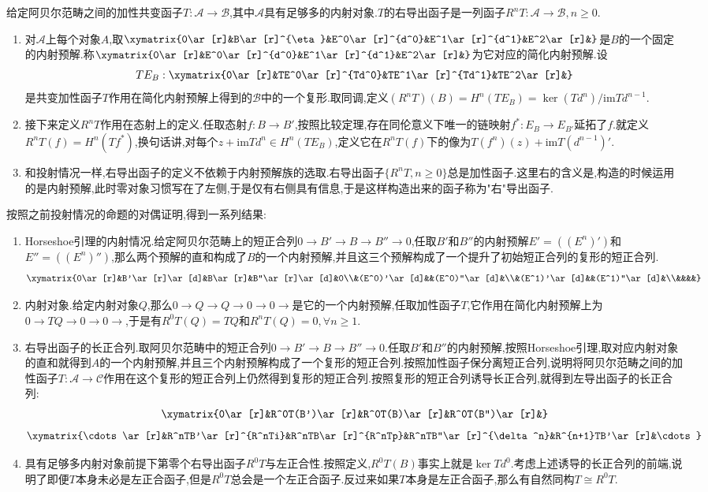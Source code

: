 给定阿贝尔范畴之间的加性共变函子$T:\mathscr{A}\to\mathscr{B}$,其中$\mathscr{A}$具有足够多的内射对象.$T$的右导出函子是一列函子$R^nT:\mathscr{A}\to\mathscr{B},n\ge0$.
\begin{enumerate}
	\item 对$\mathscr{A}$上每个对象$A$,取$\xymatrix{0\ar[r]&B\ar[r]^{\eta}&E^0\ar[r]^{d^0}&E^1\ar[r]^{d^1}&E^2\ar[r]&}$是$B$的一个固定的内射预解.称$\xymatrix{0\ar[r]&E^0\ar[r]^{d^0}&E^1\ar[r]^{d^1}&E^2\ar[r]&}$为它对应的简化内射预解.设$$TE_B:\xymatrix{0\ar[r]&TE^0\ar[r]^{Td^0}&TE^1\ar[r]^{Td^1}&TE^2\ar[r]&}$$是共变加性函子$T$作用在简化内射预解上得到的$\mathscr{B}$中的一个复形.取同调,定义$(R^nT)(B)=H^n(TE_B)=\ker(Td^n)/\mathrm{im}Td^{n-1}$.
	\item 接下来定义$R^nT$作用在态射上的定义.任取态射$f:B\to B'$,按照比较定理,存在同伦意义下唯一的链映射$f^*:E_B\to E_{B'}$延拓了$f$.就定义$R^nT(f)=H^n(Tf^*)$,换句话讲,对每个$z+\mathrm{im}Td^{n}\in H^n(TE_B)$,定义它在$R^nT(f)$下的像为$T(f^n)(z)+\mathrm{im}T(d^{n-1})'$.
	\item 和投射情况一样,右导出函子的定义不依赖于内射预解族的选取.右导出函子$\{R^nT,n\ge0\}$总是加性函子.这里右的含义是,构造的时候运用的是内射预解,此时零对象习惯写在了左侧,于是仅有右侧具有信息,于是这样构造出来的函子称为"右"导出函子.
\end{enumerate}

按照之前投射情况的命题的对偶证明,得到一系列结果:
\begin{enumerate}
	\item Horseshoe引理的内射情况.给定阿贝尔范畴上的短正合列$0\to B'\to B\to B''\to0$,任取$B'$和$B''$的内射预解$E'=((E^n)')$和$E''=((E^n)'')$,那么两个预解的直和构成了$B$的一个内射预解,并且这三个预解构成了一个提升了初始短正合列的复形的短正合列.
	$$\xymatrix{0\ar[r]&B'\ar[r]\ar[d]&B\ar[r]&B''\ar[r]\ar[d]&0\\&(E^0)'\ar[d]&&(E^0)''\ar[d]&\\&(E^1)'\ar[d]&&(E^1)''\ar[d]&\\&&&&}$$
	\item 内射对象.给定内射对象$Q$,那么$0\to Q\to Q\to0\to0\to$是它的一个内射预解,任取加性函子$T$,它作用在简化内射预解上为$0\to TQ\to0\to0\to$,于是有$R^0T(Q)=TQ$和$R^nT(Q)=0,\forall n\ge1$.
	\item 右导出函子的长正合列.取阿贝尔范畴中的短正合列$0\to B'\to B\to B''\to0$.任取$B'$和$B''$的内射预解,按照Horseshoe引理,取对应内射对象的直和就得到$A$的一个内射预解,并且三个内射预解构成了一个复形的短正合列.按照加性函子保分离短正合列,说明将阿贝尔范畴之间的加性函子$T:\mathscr{A}\to\mathscr{C}$作用在这个复形的短正合列上仍然得到复形的短正合列.按照复形的短正合列诱导长正合列,就得到左导出函子的长正合列:
	$$\xymatrix{0\ar[r]&R^0T(B')\ar[r]&R^0T(B)\ar[r]&R^0T(B'')\ar[r]&}$$
	$$\xymatrix{\cdots\ar[r]&R^nTB'\ar[r]^{R^nTi}&R^nTB\ar[r]^{R^nTp}&R^nTB''\ar[r]^{\delta^n}&R^{n+1}TB'\ar[r]&\cdots}$$
	\item 具有足够多内射对象前提下第零个右导出函子$R^0T$与左正合性.按照定义,$R^0T(B)$事实上就是$\ker Td^0$.考虑上述诱导的长正合列的前端,说明了即便$T$本身未必是左正合函子,但是$R^0T$总会是一个左正合函子.反过来如果$T$本身是左正合函子,那么有自然同构$T\cong R^0T$.
\end{enumerate}

